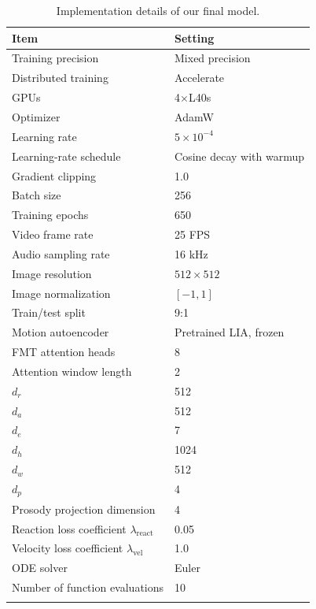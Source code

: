 \begin{table}[!htbp]
    \centering
    \small
    \caption{Implementation details of our final model.}
    \label{tab:app_training_config}
    \begin{tabular}{ll}
        \Xhline{1.2pt}
        Item & Setting \\
        \hline
        Training precision & Mixed precision \\
        Distributed training & Accelerate \\
        GPUs & 4$\times$L40s \\
        Optimizer & AdamW \\
        Learning rate & $5\times10^{-4}$ \\
        Learning-rate schedule & Cosine decay with warmup \\
        Gradient clipping & 1.0 \\
        Batch size & 256 \\
        Training epochs & 650 \\
        Video frame rate & 25 FPS \\
        Audio sampling rate & 16 kHz \\
        Image resolution & $512\times512$ \\
        Image normalization & $[-1,1]$ \\
        Train/test split & 9:1 \\
        Motion autoencoder & Pretrained LIA, frozen \\
        FMT attention heads & 8 \\
        Attention window length & 2 \\
        $d_r$ & 512 \\
        $d_a$ & 512 \\
        $d_e$ & 7 \\
        $d_h$ & 1024 \\
        $d_w$ & 512 \\
        $d_p$ & 4 \\
        Prosody projection dimension & 4 \\
        Reaction loss coefficient $\lambda_{\mathrm{react}}$ & 0.05 \\
        Velocity loss coefficient $\lambda_{\mathrm{vel}}$ & 1.0 \\
        ODE solver & Euler \\
        Number of function evaluations & 10 \\
        \Xhline{1.2pt}
    \end{tabular}
\end{table}







